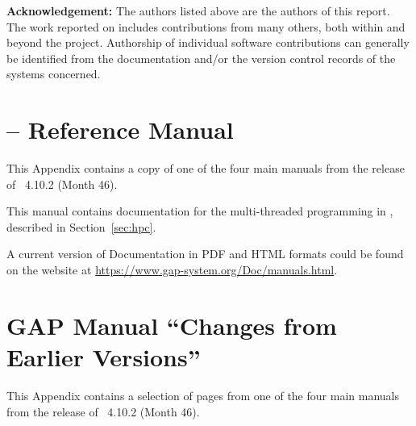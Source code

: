 \documentclass{deliverablereport}
\author{Alexander Konovalov, Stephen Linton and Michael Torpey}
\begin{document}
\maketitle
\githubissuedescription

\vfill

\textbf{Acknowledgement:} The authors listed above are the authors of
this report. The work reported on includes contributions from many
others, both within and beyond the \ODK project. Authorship of
individual software contributions can generally be identified from
the documentation and/or the version control records of the systems concerned.

\vfill
\newpage
\tableofcontents















\clearpage
\appendix

\section{\HPCGAP -- Reference Manual}\label{sec:hpc-manual}

This Appendix contains a copy of 
one of the four main \GAP manuals
from the release of \GAP~4.10.2 (Month 46).

This manual contains documentation for the multi-threaded programming
in \GAP, described in Section~\ref{sec:hpc}.

A current version of \GAP Documentation in PDF and HTML formats
could be found on the \GAP website at \url{https://www.gap-system.org/Doc/manuals.html}.



\section{GAP Manual ``Changes from Earlier Versions''}\label{sec:changes-manual}

This Appendix contains a selection of pages from
one of the four main \GAP manuals
from the release of \GAP~4.10.2 (Month 46).
\end{document}
